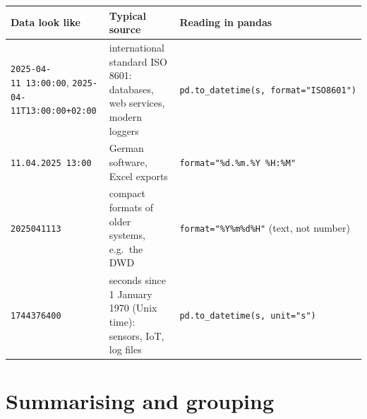 \documentclass[
  letterpaper,
  DIV=11,
  numbers=noendperiod]{scrreprt}
\begin{document}
\begin{tcolorbox}
\begin{longtable}[]{@{}
  >{\raggedright\arraybackslash}p{}
  >{\raggedright\arraybackslash}p{}
  >{\raggedright\arraybackslash}p{}@{}}
\toprule\noalign{}
\begin{minipage}[b]{\linewidth}\raggedright
Data look like
\end{minipage} & \begin{minipage}[b]{\linewidth}\raggedright
Typical source
\end{minipage} & \begin{minipage}[b]{\linewidth}\raggedright
Reading in pandas
\end{minipage} \\
\midrule\noalign{}
\endhead
\bottomrule\noalign{}
\endlastfoot
\texttt{2025-04-11\ 13:00:00}, \texttt{2025-04-11T13:00:00+02:00} &
international standard ISO 8601: databases, web services, modern loggers
& \texttt{pd.to\_datetime(s,\ format="ISO8601")} \\
\texttt{11.04.2025\ 13:00} & German software, Excel exports &
\texttt{format="\%d.\%m.\%Y\ \%H:\%M"} \\
\texttt{2025041113} & compact formats of older systems, e.g.~the DWD &
\texttt{format="\%Y\%m\%d\%H"} (text, not number) \\
\texttt{1744376400} & seconds since 1 January 1970 (Unix time): sensors,
IoT, log files & \texttt{pd.to\_datetime(s,\ unit="s")} \\
\end{longtable}

\end{tcolorbox}

\section{Summarising and grouping}\label{summarising-and-grouping}
\end{document}
